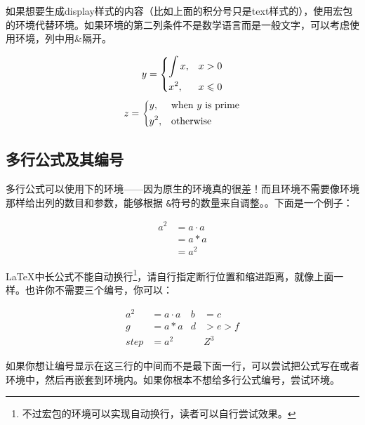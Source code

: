 如果想要生成display样式的内容（比如上面的积分号只是text样式的），使用宏包的环境代替环境。如果环境的第二列条件不是数学语言而是一般文字，可以考虑使用环境，列中用\&{}隔开。

\begin{codeshow}
\[y=\begin{dcases}
  \int x, & x>0 \\
  x^2, & x\leqslant 0
  \end{dcases}\]
\[z=\begin{dcases*}
  y, & when $y$ is prime\\
  y^2, & otherwise
  \end{dcases*}\]
\end{codeshow}

\subsection{多行公式及其编号}
\label{subsec:multieqnum}
多行公式可以使用下的环境——因为原生的环境真的很差！而且环境不需要像环境那样给出列的数目和参数，能够根据
\texttt{\&}符号的数量来自调整。。下面是一个例子：

\begin{codeshow}
\begin{align}
  a^2  &= a\cdot a \\
       &= a*a      \\
       &= a^2
\end{align}
\end{codeshow}

\LaTeX 中长公式不能自动换行\footnote{不过宏包的环境可以实现自动换行，读者可以自行尝试效果。}，请自行指定断行位置和缩进距离，就像上面一样。也许你不需要三个编号，你可以：

\begin{codeshow}
\begin{align}
  a^2&= a\cdot a& b&=c\nonumber\\
  g  &= a*a & d&>e>f  \nonumber\\
  step&= a^2 & &Z^3
\end{align}
\end{codeshow}

如果你想让编号显示在这三行的中间而不是最下面一行，可以尝试把公式写在或者环境中，然后再嵌套到环境内。如果你根本不想给多行公式编号，尝试环境。

